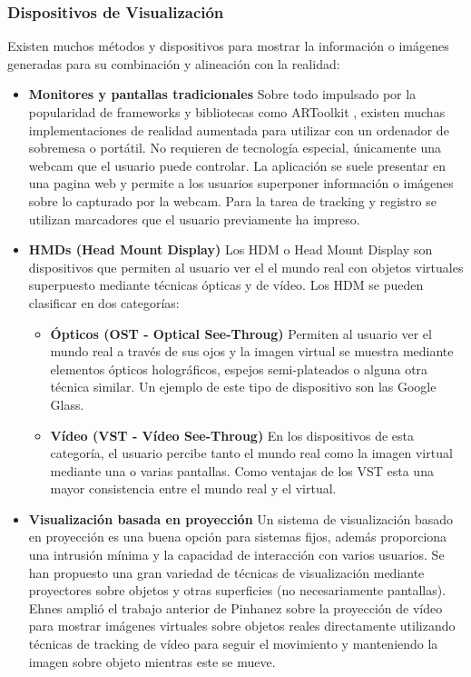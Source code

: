 \subsubsection{Dispositivos  de Visualización}
Existen  muchos métodos y dispositivos para mostrar la información o imágenes generadas para su combinación y alineación con la realidad: 
\begin{itemize}
\item \textbf{Monitores y pantallas tradicionales}
  Sobre todo impulsado por la popularidad de frameworks y bibliotecas como ARToolkit \cite{Kato}, existen muchas implementaciones de realidad aumentada para utilizar con un ordenador de sobremesa o portátil. No requieren de tecnología especial, únicamente una webcam que el usuario puede controlar. La aplicación se suele presentar en una pagina web y permite a los usuarios superponer información o imágenes sobre lo capturado por la webcam. Para la tarea de tracking y registro se utilizan marcadores que el usuario previamente ha impreso.
  
\item \textbf{HMDs (Head Mount Display)} Los HDM o Head Mount Display son dispositivos que permiten al usuario ver el el mundo real con objetos virtuales superpuesto mediante técnicas ópticas y de vídeo. Los HDM se pueden clasificar en dos categorías:
  \begin{itemize}
  \item \textbf{Ópticos (OST - Optical See-Throug)} Permiten al usuario ver el mundo real a través de sus ojos y la imagen virtual se muestra mediante elementos ópticos holográficos, espejos semi-plateados o alguna otra técnica similar. Un ejemplo de este tipo de dispositivo son las Google Glass.
    
  \item \textbf{Vídeo (VST - Vídeo See-Throug)} En los dispositivos de esta categoría, el usuario percibe tanto el mundo real como la imagen virtual mediante una o varias pantallas. Como ventajas de los VST esta una mayor consistencia entre el mundo real y el virtual.
  \end{itemize}
  
\item \textbf{Visualización basada en proyección}
  Un sistema de visualización basado en proyección es una buena opción para sistemas fijos, además proporciona una intrusión mínima y la capacidad de interacción con varios usuarios.
  Se han propuesto una gran variedad de técnicas de visualización mediante proyectores sobre objetos y otras superficies (no necesariamente pantallas). Ehnes \cite{Ehnes} amplió el trabajo anterior de Pinhanez \cite{Pinhanez} sobre la proyección de vídeo para mostrar imágenes virtuales sobre objetos reales directamente utilizando técnicas de tracking de vídeo para seguir el movimiento y manteniendo la imagen sobre objeto mientras este se mueve.
  

\end{itemize}
